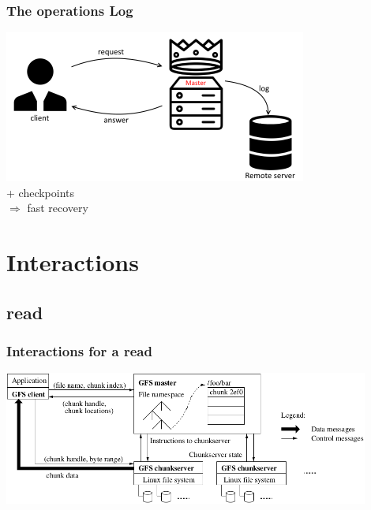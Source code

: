 \documentclass{beamer}
\newcommand{\slidewidth}{12cm}
\begin{document}
\begin{frame}
 \frametitle{The operations Log}
 \begin{center}
 \includegraphics[height=5cm]{figures/logschema.png}
 \\\alert{+ checkpoints}\\
 $\Rightarrow$ fast recovery
 \end{center}
\end{frame}

\section{Interactions}
\subsection{read}
\begin{frame}
 \frametitle{Interactions for a read}
 \centering
 \includegraphics[width=\slidewidth]{figures/GFSarchitecture.png}
\end{frame}
\end{document}

